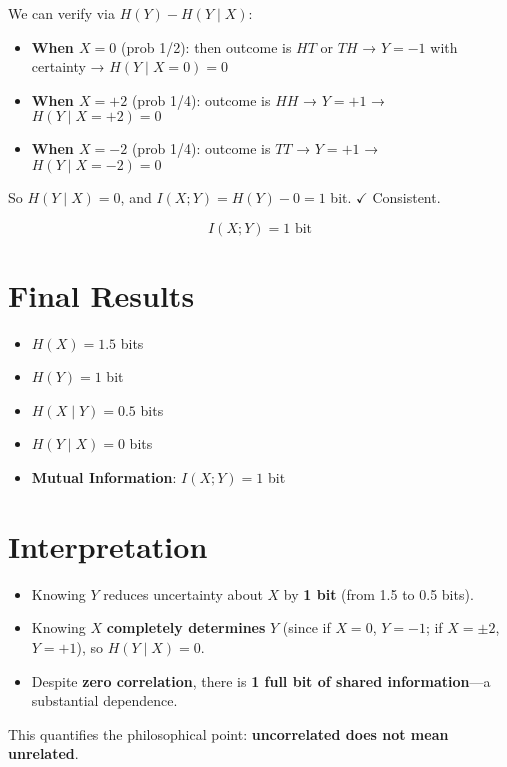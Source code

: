 \documentclass{article}
\begin{document}
We can verify via \(H(Y) - H(Y \mid X)\):

\begin{itemize}
\item \textbf{When \(X = 0\)} (prob 1/2): then outcome is \(HT\) or \(TH\) → \(Y = -1\) with certainty → \(H(Y \mid X = 0) = 0\)
    \item \textbf{When \(X = +2\)} (prob 1/4): outcome is \(HH\) → \(Y = +1\) → \(H(Y \mid X = +2) = 0\)
    \item \textbf{When \(X = -2\)} (prob 1/4): outcome is \(TT\) → \(Y = +1\) → \(H(Y \mid X = -2) = 0\)
\end{itemize}

So \(H(Y \mid X) = 0\), and \(I(X; Y) = H(Y) - 0 = 1\) bit. \(\checkmark\) Consistent.

\[
\boxed{I(X; Y) = 1 \text{ bit}}
\]

\section*{Final Results}

\begin{itemize}
\item \(H(X) = 1.5\) bits  
    \item \(H(Y) = 1\) bit  
    \item \(H(X \mid Y) = 0.5\) bits  
    \item \(H(Y \mid X) = 0\) bits  
    \item \textbf{Mutual Information}: \(I(X; Y) = 1\) bit
\end{itemize}

\section*{Interpretation}

\begin{itemize}
\item Knowing \(Y\) reduces uncertainty about \(X\) by \textbf{1 bit} (from 1.5 to 0.5 bits).
    \item Knowing \(X\) \textbf{completely determines} \(Y\) (since if \(X = 0\), \(Y = -1\); if \(X = \pm 2\), \(Y = +1\)), so \(H(Y \mid X) = 0\).
    \item Despite \textbf{zero correlation}, there is \textbf{1 full bit of shared information}—a substantial dependence.
\end{itemize}

This quantifies the philosophical point: \textbf{uncorrelated does not mean unrelated}.
\end{document}
